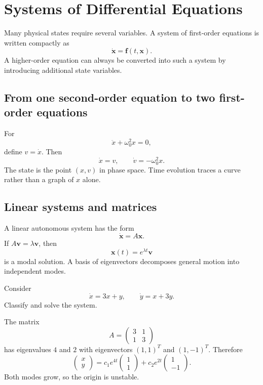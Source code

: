 \section{Systems of Differential Equations}
\label{sec:ch4-systems}

Many physical states require several variables. A system of first-order equations is written compactly as
\[
\dot{\mathbf{x}}=\mathbf{f}(t,\mathbf{x}).
\]
A higher-order equation can always be converted into such a system by introducing additional state variables.

\subsection{From one second-order equation to two first-order equations}
For
\[
\ddot x+\omega_0^2x=0,
\]
define $v=\dot x$. Then
\[
\dot x=v,\qquad \dot v=-\omega_0^2x.
\]
The state is the point $(x,v)$ in phase space. Time evolution traces a curve rather than a graph of $x$ alone.

\subsection{Linear systems and matrices}
A linear autonomous system has the form
\[
\dot{\mathbf{x}}=A\mathbf{x}.
\]
If $A\mathbf{v}=\lambda\mathbf{v}$, then
\[
\mathbf{x}(t)=e^{\lambda t}\mathbf{v}
\]
is a modal solution. A basis of eigenvectors decomposes general motion into independent modes.

\begin{workedexample}
Consider
\[
\dot x=3x+y,\qquad \dot y=x+3y.
\]
Classify and solve the system.
\begin{solution}
The matrix
\[
A=\begin{pmatrix}3&1\\1&3\end{pmatrix}
\]
has eigenvalues $4$ and $2$ with eigenvectors $(1,1)^T$ and $(1,-1)^T$. Therefore
\[
\boxed{\begin{pmatrix}x\\y\end{pmatrix}=c_1e^{4t}\begin{pmatrix}1\\1\end{pmatrix}+c_2e^{2t}\begin{pmatrix}1\\-1\end{pmatrix}}.
\]
Both modes grow, so the origin is unstable.
\end{solution}
\end{workedexample}

